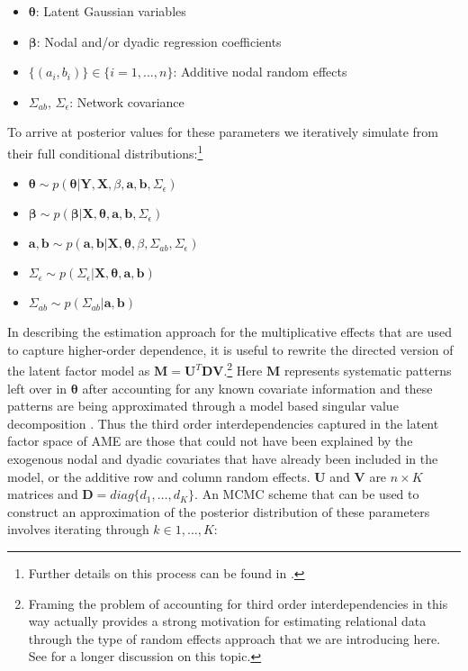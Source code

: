 \begin{itemize}
	\item $\bm\theta$: Latent Gaussian variables
	\item $\bm\beta$: Nodal and/or dyadic regression coefficients
	\item $\{(a_{i},b_{i})\} \in \{i=1, \ldots, n \}$: Additive nodal random effects
	\item $\Sigma_{ab},\, \Sigma_{\epsilon}$: Network covariance
\end{itemize}

To arrive at posterior values for these parameters we iteratively simulate from their full conditional distributions:\footnote{Further details on this process can be found in \citet{hoff:2005}.}

\begin{itemize}
	\item $\bm\theta \sim p(\bm\theta | \mathbf{Y}, \mathbf{X}, \beta, \mathbf{a}, \mathbf{b}, \Sigma_{\epsilon})$	
	\item $\bm\beta \sim p(\bm\beta | \mathbf{X}, \bm\theta, \mathbf{a}, \mathbf{b}, \Sigma_{\epsilon})$
	\item $\mathbf{a}, \mathbf{b} \sim p(\mathbf{a}, \mathbf{b} | \mathbf{X}, \bm\theta, \beta, \Sigma_{ab}, \Sigma_{\epsilon})$
	\item $\Sigma_{\epsilon} \sim p(\Sigma_{\epsilon} | \mathbf{X}, \bm\theta, \mathbf{a}, \mathbf{b})$
	\item $\Sigma_{ab} \sim p(\Sigma_{ab} | \mathbf{a}, \mathbf{b})$
\end{itemize}

In describing the estimation approach for the multiplicative effects that are used to capture higher-order dependence, it is useful to rewrite the directed version of the latent factor model as $\mathbf{M} = \mathbf{U}^{T} \mathbf{D} \mathbf{V}$.\footnote{Framing the problem of accounting for third order interdependencies in this way actually provides a strong motivation for estimating relational data through the type of random effects approach that we are introducing here. See \citet{hoff:2009} for a longer discussion on this topic.} Here $\mathbf{M}$ represents systematic patterns left over in $\bm\theta$ after accounting for any known covariate information and these patterns are being approximated through a model based singular value decomposition \citep{hoff:2009}. Thus the third order interdependencies captured in the latent factor space of AME are those that could not have been explained by the exogenous nodal and dyadic covariates that have already been included in the model, or the additive row and column random effects. $\mathbf{U}$ and $\mathbf{V}$ are $n \times K$ matrices and $\mathbf{D}=diag\{d_{1}, \ldots, d_{K}\}$. An MCMC scheme that can be used to construct an approximation of the posterior distribution of these parameters involves iterating through $k \in 1, \ldots, K$:


